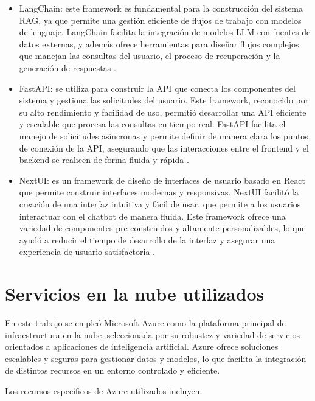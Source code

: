 \begin{itemize}
	\item LangChain: este framework es fundamental para la construcción del sistema RAG, ya que permite una gestión 
	eficiente de flujos de trabajo con modelos de lenguaje. LangChain facilita la integración de modelos LLM con fuentes de datos externas, 
	y además ofrece herramientas para diseñar flujos complejos 
	que manejan las consultas del usuario, el proceso de recuperación y la generación de respuestas \citep{website:langchain}.
	\item FastAPI: se utiliza para construir la API que conecta los componentes del sistema y gestiona las solicitudes del usuario. 
	Este framework, reconocido por su alto rendimiento y facilidad de uso, permitió desarrollar una API eficiente y escalable que procesa 
	las consultas en tiempo real. FastAPI facilita el manejo de solicitudes asíncronas y permite definir de manera clara los puntos 
	de conexión de la API, asegurando que las interacciones entre el frontend y el backend se 
	realicen de forma fluida y rápida \citep{website:fastapi}.
	\item NextUI: es un framework de diseño de interfaces de usuario 
	basado en React que permite construir interfaces modernas y responsivas. NextUI facilitó la creación de una interfaz intuitiva 
	y fácil de usar, que permite a los usuarios interactuar con el chatbot de manera fluida. Este framework ofrece una variedad de 
	componentes pre-construidos y altamente personalizables, lo que ayudó a reducir el tiempo de desarrollo de la interfaz y asegurar 
	una experiencia de usuario satisfactoria \citep{website:nextui}.
\end{itemize}

\section{Servicios en la nube utilizados}

En este trabajo se empleó Microsoft Azure \citep{website:azure} como la plataforma principal de infraestructura en la nube, seleccionada por su robustez y 
variedad de servicios orientados a aplicaciones de inteligencia artificial. Azure ofrece soluciones 
escalables y seguras para gestionar datos y modelos, lo que facilita la integración de distintos recursos en un entorno controlado y eficiente.

Los recursos específicos de Azure utilizados incluyen:

